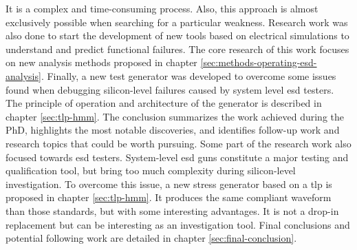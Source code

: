 It is a complex and time-consuming process.
Also, this approach is almost exclusively possible when searching for a particular weakness.
Research work was also done to start the development of new tools based on electrical simulations to understand and predict functional failures.
The core research of this work focuses on new analysis methods proposed in chapter \ref{sec:methods-operating-esd-analysis}.
%
Finally, a new test generator was developed to overcome some issues found when debugging silicon-level failures caused by system level \gls{esd} testers.
The principle of operation and architecture of the generator is described in chapter \ref{sec:tlp-hmm}.
The conclusion summarizes the work achieved during the PhD, highlights the most notable discoveries, and identifies follow-up work and research topics that could be worth pursuing.
Some part of the research work also focused towards \gls{esd} testers.
System-level \gls{esd} guns \cite{iec61000-4-2, iso10605} constitute a major testing and qualification tool, but bring too much complexity during silicon-level investigation.
To overcome this issue, a new stress generator based on a \gls{tlp} is proposed in chapter \ref{sec:tlp-hmm}.
It produces the same compliant waveform than those standards, but with some interesting advantages.
It is not a drop-in replacement but can be interesting as an investigation tool.
%
Final conclusions and potential following work are detailed in chapter \ref{sec:final-conclusion}.

